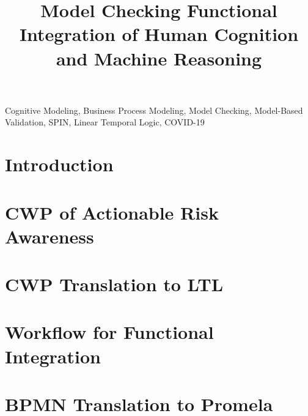 \documentclass[conference]{IEEEtran}
\begin{document}
\title{
  Model Checking Functional Integration of Human Cognition and Machine Reasoning
}

\author{
\and
{}
\and
{}
}

\maketitle

\begin{abstract}
    
\end{abstract}

\begin{IEEEkeywords}
    Cognitive Modeling, Business Process Modeling, Model Checking, Model-Based Validation, SPIN, Linear Temporal Logic, COVID-19
\end{IEEEkeywords}

\section{Introduction}


\section{CWP of Actionable Risk Awareness}
\label{sec:cwp}


\section{CWP Translation to LTL}
\label{sec:ltl}


\section{Workflow for Functional Integration}
\label{sec:workflow}


\section{BPMN Translation to Promela}
\label{sec:bpmn}

\end{document}
